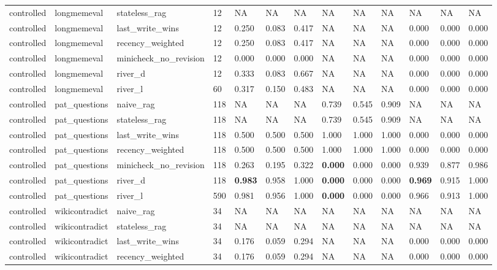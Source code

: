 \begin{table}
\begin{tabular}{lllllllllllll}
controlled & longmemeval & stateless\_rag & 12 & NA & NA & NA & NA & NA & NA & NA & NA & NA \\
controlled & longmemeval & last\_write\_wins & 12 & 0.250 & 0.083 & 0.417 & NA & NA & NA & 0.000 & 0.000 & 0.000 \\
controlled & longmemeval & recency\_weighted & 12 & 0.250 & 0.083 & 0.417 & NA & NA & NA & 0.000 & 0.000 & 0.000 \\
controlled & longmemeval & minicheck\_no\_revision & 12 & 0.000 & 0.000 & 0.000 & NA & NA & NA & 0.000 & 0.000 & 0.000 \\
controlled & longmemeval & river\_d & 12 & 0.333 & 0.083 & 0.667 & NA & NA & NA & 0.000 & 0.000 & 0.000 \\
controlled & longmemeval & river\_l & 60 & 0.317 & 0.150 & 0.483 & NA & NA & NA & 0.000 & 0.000 & 0.000 \\
controlled & pat\_questions & naive\_rag & 118 & NA & NA & NA & 0.739 & 0.545 & 0.909 & NA & NA & NA \\
controlled & pat\_questions & stateless\_rag & 118 & NA & NA & NA & 0.739 & 0.545 & 0.909 & NA & NA & NA \\
controlled & pat\_questions & last\_write\_wins & 118 & 0.500 & 0.500 & 0.500 & 1.000 & 1.000 & 1.000 & 0.000 & 0.000 & 0.000 \\
controlled & pat\_questions & recency\_weighted & 118 & 0.500 & 0.500 & 0.500 & 1.000 & 1.000 & 1.000 & 0.000 & 0.000 & 0.000 \\
controlled & pat\_questions & minicheck\_no\_revision & 118 & 0.263 & 0.195 & 0.322 & \textbf{0.000} & 0.000 & 0.000 & 0.939 & 0.877 & 0.986 \\
controlled & pat\_questions & river\_d & 118 & \textbf{0.983} & 0.958 & 1.000 & \textbf{0.000} & 0.000 & 0.000 & \textbf{0.969} & 0.915 & 1.000 \\
controlled & pat\_questions & river\_l & 590 & 0.981 & 0.956 & 1.000 & \textbf{0.000} & 0.000 & 0.000 & 0.966 & 0.913 & 1.000 \\
controlled & wikicontradict & naive\_rag & 34 & NA & NA & NA & NA & NA & NA & NA & NA & NA \\
controlled & wikicontradict & stateless\_rag & 34 & NA & NA & NA & NA & NA & NA & NA & NA & NA \\
controlled & wikicontradict & last\_write\_wins & 34 & 0.176 & 0.059 & 0.294 & NA & NA & NA & 0.000 & 0.000 & 0.000 \\
controlled & wikicontradict & recency\_weighted & 34 & 0.176 & 0.059 & 0.294 & NA & NA & NA & 0.000 & 0.000 & 0.000 \\

\end{tabular}
\end{table}
